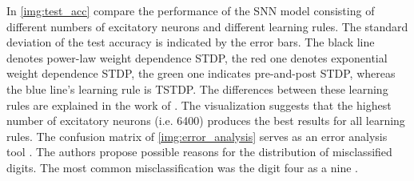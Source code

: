 In \autoref{img:test_acc} \authorsSNN{} \cite{SNN} compare the performance of the \ac{SNN} model consisting of different numbers of excitatory neurons 
and different learning rules.
The standard deviation of the test accuracy is indicated by the error bars.
The black line denotes power-law weight dependence \ac{STDP}, the red one denotes exponential weight dependence \ac{STDP}, 
the green one indicates pre-and-post \ac{STDP}, whereas the blue line's learning rule is \ac{TSTDP}.
The differences between these learning rules are explained in the work of \authorsSNN{} \cite{SNN}.
The visualization suggests that the highest number of excitatory neurons (i.e. 6400) produces the best results for all learning rules.
The confusion matrix of \autoref{img:error_analysis} serves as an error analysis tool \cite{SNN}.
The authors propose possible reasons for the distribution of misclassified digits.
The most common misclassification was the digit four as a nine \cite{SNN}.
\vspace{-4mm}
